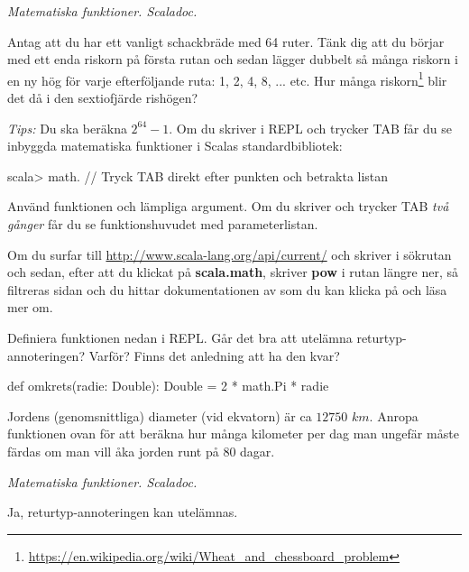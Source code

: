 \QUESTEND





\def\what{\emph{Matematiska funktioner. Scaladoc.}}

\QUESTBEGIN

\Task \what

\Subtask Antag att du har ett vanligt schackbräde med 64 ruter. Tänk dig att du börjar med ett enda riskorn på första rutan och sedan lägger dubbelt så många riskorn i en ny hög för varje efterföljande ruta: 1, 2, 4, 8, ...  etc. Hur många riskorn\footnote{\url{https://en.wikipedia.org/wiki/Wheat_and_chessboard_problem}} blir det då i den sextiofjärde rishögen?

\emph{Tips:} Du ska beräkna $2^{64} - 1$. Om du skriver  i REPL och trycker TAB får du se inbyggda matematiska funktioner i Scalas standardbibliotek:
\begin{REPL}
scala> math.    // Tryck TAB direkt efter punkten och betrakta listan
\end{REPL}
Använd funktionen  och lämpliga argument. Om du skriver  och trycker TAB \emph{två gånger} får du se funktionshuvudet med parameterlistan. 

Om du surfar till \url{http://www.scala-lang.org/api/current/} och skriver  i sökrutan och sedan, efter att du klickat på \textbf{\textsf{\small scala.math}}, skriver \textbf{\textsf{\small pow}} i rutan längre ner, så filtreras sidan och du hittar dokumentationen av  som du kan klicka på och läsa mer om.   

\Subtask Definiera funktionen  nedan i REPL. Går det bra att utelämna returtyp-annoteringen? Varför? Finns det anledning att ha den kvar?
\begin{Code}
def omkrets(radie: Double): Double = 2 * math.Pi * radie
\end{Code}

\Subtask Jordens (genomsnittliga) diameter (vid ekvatorn) är ca $12 750$ $km$. Anropa funktionen  ovan för att beräkna hur många kilometer per dag man ungefär måste färdas om man vill åka jorden runt på 80 dagar. 

\SOLUTION

\TaskSolved \what

\SubtaskSolved Ja, returtyp-annoteringen  kan utelämnas. 

